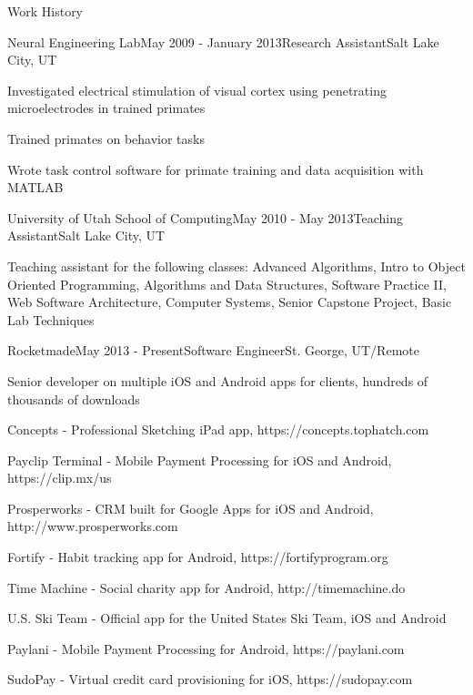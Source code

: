 \documentclass{resume} %
\begin{document}
\begin{rSection}{Work History}


\begin{rSubsection}{Neural Engineering Lab}{May 2009 - January 2013}{Research Assistant}{Salt Lake City, UT}
\item Investigated electrical stimulation of visual cortex using penetrating microelectrodes in trained primates
\item Trained primates on behavior tasks
\item Wrote task control software for primate training and data acquisition with MATLAB
\end{rSubsection}


\begin{rSubsection}{University of Utah School of Computing}{May 2010 - May 2013}{Teaching Assistant}{Salt Lake City, UT}
\item Teaching assistant for the following classes: Advanced Algorithms, Intro to Object Oriented Programming, Algorithms and Data Structures, Software Practice II, Web Software Architecture, Computer Systems, Senior Capstone Project, Basic Lab Techniques
\end{rSubsection}



\begin{rSubsection}{Rocketmade}{May 2013 - Present}{Software Engineer}{St. George, UT/Remote}
\item Senior developer on multiple iOS and Android apps for clients, hundreds of thousands of downloads
\item Concepts - Professional Sketching iPad app, https://concepts.tophatch.com
\item Payclip Terminal - Mobile Payment Processing for iOS and Android, https://clip.mx/us
\item Prosperworks - CRM built for Google Apps for iOS and Android, http://www.prosperworks.com
\item Fortify - Habit tracking app for Android, https://fortifyprogram.org
\item Time Machine - Social charity app for Android, http://timemachine.do
\item U.S. Ski Team - Official app for the United States Ski Team, iOS and Android
\item Paylani - Mobile Payment Processing for Android, https://paylani.com
\item SudoPay - Virtual credit card provisioning for iOS, https://sudopay.com
\end{rSubsection}

\end{rSection}
\end{document}
